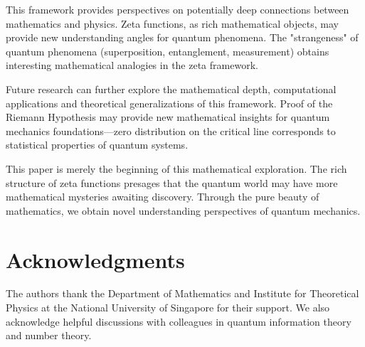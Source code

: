 \documentclass[11pt]{article}
\theoremstyle{plain}
\theoremstyle{definition}
\theoremstyle{remark}
\begin{document}
This framework provides perspectives on potentially deep connections between mathematics and physics. Zeta functions, as rich mathematical objects, may provide new understanding angles for quantum phenomena. The "strangeness" of quantum phenomena (superposition, entanglement, measurement) obtains interesting mathematical analogies in the zeta framework.

Future research can further explore the mathematical depth, computational applications and theoretical generalizations of this framework. Proof of the Riemann Hypothesis may provide new mathematical insights for quantum mechanics foundations—zero distribution on the critical line corresponds to statistical properties of quantum systems.

This paper is merely the beginning of this mathematical exploration. The rich structure of zeta functions presages that the quantum world may have more mathematical mysteries awaiting discovery. Through the pure beauty of mathematics, we obtain novel understanding perspectives of quantum mechanics.

\section*{Acknowledgments}

The authors thank the Department of Mathematics and Institute for Theoretical Physics at the National University of Singapore for their support. We also acknowledge helpful discussions with colleagues in quantum information theory and number theory.



\end{document}

